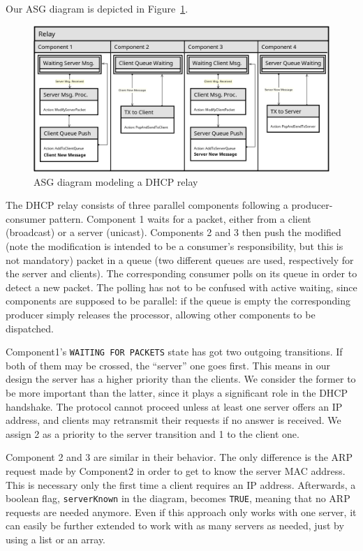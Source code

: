 Our ASG diagram is depicted in Figure~\ref{fig:asg}.
\begin{figure}[h]
	\centering\includegraphics[scale=0.5]{images/asg-diagram}
	\caption{ASG diagram modeling a DHCP relay}
	\label{fig:asg}
\end{figure}

The DHCP relay consists of three parallel components following a producer-consumer pattern. Component 1 waits for a packet, either from a client (broadcast) or a server (unicast). Components 2 and 3 then push the modified (note the modification is intended to be a consumer's responsibility, but this is not mandatory) packet in a queue (two different queues are used, respectively for the server and clients). The corresponding consumer polls on its queue in order to detect a new packet. The polling has not to be confused with active waiting, since components are supposed to be parallel: if the queue is empty the corresponding producer simply releases the processor, allowing other components to be dispatched.

Component1's \texttt{WAITING FOR PACKETS} state has got two outgoing transitions. If both of them may be crossed, the ``server'' one goes first. This means in our design the server has a higher priority than the clients. We consider the former to be more important than the latter, since it plays a significant role in the DHCP handshake. The protocol cannot proceed unless at least one server offers an IP address, and clients may retransmit their requests if no answer is received. We assign 2 as a priority to the server transition and 1 to the client one.

Component 2 and 3 are similar in their behavior. The only difference is the ARP request made by Component2 in order to get to know the server MAC address. This is necessary only the first time a client requires an IP address. Afterwards, a boolean flag, \texttt{serverKnown} in the diagram, becomes \texttt{TRUE}, meaning that no ARP requests are needed anymore. Even if this approach only works with one server, it can easily be further extended to work with as many servers as needed, just by using a list or an array.

